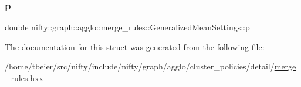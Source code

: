 \subsubsection{\texorpdfstring{p}{p}}
{\footnotesize\ttfamily double nifty\+::graph\+::agglo\+::merge\+\_\+rules\+::\+Generalized\+Mean\+Settings\+::p}



The documentation for this struct was generated from the following file\+:\begin{DoxyCompactItemize}
\item 
/home/tbeier/src/nifty/include/nifty/graph/agglo/cluster\+\_\+policies/detail/\hyperlink{merge__rules_8hxx}{merge\+\_\+rules.\+hxx}\end{DoxyCompactItemize}
